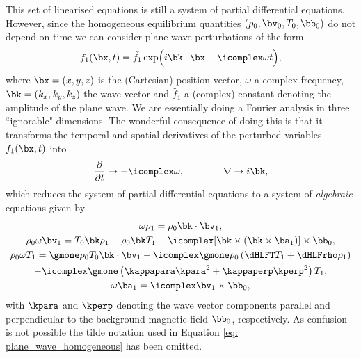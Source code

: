 This set of linearised equations is still a system of partial differential equations. However, since the homogeneous equilibrium quantities $(\rho_0, \bv_0, T_0, \bb_0)$ do not depend on time we can consider plane-wave perturbations of the form
\begin{equation} \label{eq: plane_wave_homogeneous}
  f_1(\bx, t) = \tilde{f_1}\exp\Bigl(i\bk \cdot \bx - \icomplex\omega t\Bigr),
\end{equation}
where $\bx = (x, y, z)$ is the (Cartesian) position vector, $\omega$ a complex frequency, $\bk = (k_x, k_y, k_z)$ the wave vector and $\tilde{f_1}$ a (complex) constant denoting the amplitude of the plane wave. We are essentially doing a Fourier analysis in three ``ignorable" dimensions. The wonderful consequence of doing this is that it transforms the temporal and spatial derivatives of the perturbed variables $f_1(\bx, t)$ into
\begin{equation}
  \frac{\partial}{\partial t} \rightarrow -\icomplex\omega, \qquad\qquad
  \nabla \rightarrow i\bk,
\end{equation}
which reduces the system of partial differential equations to a system of \emph{algebraic} equations given by
\begin{gather}
  \omega \rho_1 = \rho_0 \bk \cdot \bv_1, \label{eq: homo_continuity_algebraic}\\
  \rho_0\omega \bv_1 = T_0 \bk \rho_1 + \rho_0\bk T_1 - \icomplex[\bk \times (\bk \times \ba_1)]\times\bb_0, \\
  \rho_0\omega T_1 =
    \gmone \rho_0T_0 \bk \cdot \bv_1
    - \icomplex\gmone\rho_0\left(\dHLFT T_1 + \dHLFrho \rho_1\right) \nonumber \\
    - \icomplex\gmone \left(\kappapara \kpara^2 + \kappaperp\kperp^2\right)T_1, \\
  \omega \ba_1 = \icomplex\bv_1 \times \bb_0, \label{eq: homo_induction_algebraic}
\end{gather}
with $\kpara$ and $\kperp$ denoting the wave vector components parallel and perpendicular to the background magnetic field $\bb_0$, respectively. As confusion is not possible the tilde notation used in Equation \eqref{eq: plane_wave_homogeneous} has been omitted.

